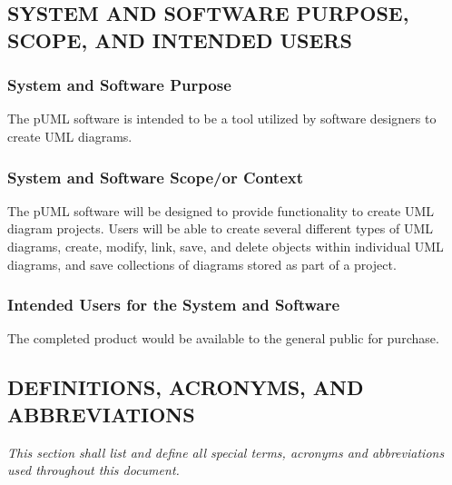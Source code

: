 \documentclass[twoside,letterpaper]{article}
\begin{document}
{{}

\subsection[SYSTEM AND SOFTWARE PURPOSE, SCOPE, AND INTENDED
USERS]{\bfseries\color{black} SYSTEM AND
SOFTWARE PURPOSE, SCOPE, AND INTENDED USERS}


\subsubsection{System and Software Purpose}
{\color{black}
The pUML software is intended to be a tool utilized by software designers to create UML diagrams.
}

\subsubsection[System and Software Scope/or Context]{System and Software
Scope/or Context}
{\color{black}
The pUML software will be designed to provide functionality to create UML diagram projects.  Users will be able to create several different types of UML diagrams, create, modify, link, save, and delete objects within individual UML diagrams, and save collections of diagrams stored as part of a project.
}

\subsubsection{Intended Users for the System and Software}
{\color{black}
The completed product would be available to the general public for purchase.
}


\clearpage
\subsection[DEFINITIONS, ACRONYMS, AND
ABBREVIATIONS]{\bfseries\color{black}
DEFINITIONS, ACRONYMS, AND ABBREVIATIONS}
{\itshape\color{black}
This section shall list and define all special terms, acronyms and
abbreviations used throughout this document.}


}
\end{document}
